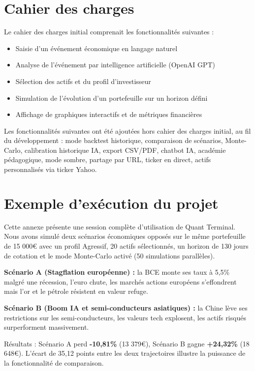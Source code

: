 \documentclass[a4paper, 12pt, twoside]{article}
\begin{document}
\section{Cahier des charges}

Le cahier des charges initial comprenait les fonctionnalités suivantes :

\begin{itemize}
    \item Saisie d'un événement économique en langage naturel
    \item Analyse de l'événement par intelligence artificielle (OpenAI GPT)
    \item Sélection des actifs et du profil d'investisseur
    \item Simulation de l'évolution d'un portefeuille sur un horizon défini
    \item Affichage de graphiques interactifs et de métriques financières
\end{itemize}

Les fonctionnalités suivantes ont été ajoutées hors cahier des charges initial, au fil
du développement : mode backtest historique, comparaison de scénarios, Monte-Carlo,
calibration historique IA, export CSV/PDF, chatbot IA, académie pédagogique, mode
sombre, partage par URL, ticker en direct, actifs personnalisés via ticker Yahoo.

\section{Exemple d'exécution du projet}

Cette annexe présente une session complète d'utilisation de Quant Terminal.
Nous avons simulé deux scénarios économiques opposés sur le même portefeuille
de 15 000\euro{} avec un profil Agressif, 20 actifs sélectionnés, un horizon de
130 jours de cotation et le mode Monte-Carlo activé (50 simulations parallèles).

\textbf{Scénario A (Stagflation européenne) :} la BCE monte ses taux à 5,5\%
malgré une récession, l'euro chute, les marchés actions européens s'effondrent
mais l'or et le pétrole résistent en valeur refuge.

\textbf{Scénario B (Boom IA et semi-conducteurs asiatiques) :} la Chine lève ses
restrictions sur les semi-conducteurs, les valeurs tech explosent, les actifs
risqués surperforment massivement.

Résultats : Scénario A perd \textbf{-10,81\%} (13 379\euro{}),
Scénario B gagne \textbf{+24,32\%} (18 648\euro{}). L'écart de 35,12 points entre
les deux trajectoires illustre la puissance de la fonctionnalité de comparaison.
\end{document}
